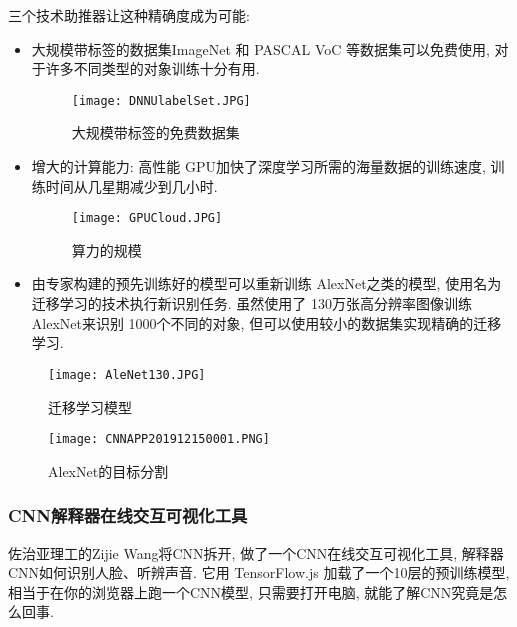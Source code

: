 三个技术助推器让这种精确度成为可能:
\begin{itemize}
\item 大规模带标签的数据集ImageNet 和 PASCAL VoC 等数据集可以免费使用, 对于许多不同类型的对象训练十分有用.
\begin{figure}[H]
    \centering
    \texttt{[image: DNNUlabelSet.JPG]}
    \caption{大规模带标签的免费数据集}
    \label{DNNUlabelSet201912250001}
    \vspace{-0.4cm}
\end{figure}
\item 增大的计算能力: 高性能 GPU加快了深度学习所需的海量数据的训练速度, 训练时间从几星期减少到几小时.
\begin{figure}[H]
    \centering
    \texttt{[image: GPUCloud.JPG]}
    \caption{算力的规模}
    \label{GPUCloud201912250002}
\end{figure}
\item 由专家构建的预先训练好的模型可以重新训练 AlexNet之类的模型, 使用名为迁移学习的技术执行新识别任务.
虽然使用了 130万张高分辨率图像训练 AlexNet来识别 1000个不同的对象, 但可以使用较小的数据集实现精确的迁移学习.
\end{itemize}
\begin{figure}[H]
    \centering
    \texttt{[image: AleNet130.JPG]}
    \caption{迁移学习模型}
    \label{AleNet130201912250003}
\end{figure}
\begin{figure}[H]
    \centering
    \texttt{[image: CNNAPP201912150001.PNG]}
    \caption{ AlexNet的目标分割}
    \label{CNNAPP201912150001}
\end{figure}
\subsubsection{CNN解释器在线交互可视化工具}
佐治亚理工的Zijie Wang将CNN拆开, 做了一个CNN在线交互可视化工具,  解释器CNN如何识别人脸、听辨声音.
它用 TensorFlow.js 加载了一个10层的预训练模型, 相当于在你的浏览器上跑一个CNN模型, 只需要打开电脑, 就能了解CNN究竟是怎么回事.

